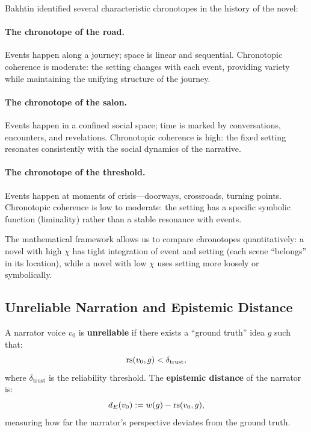 \begin{interpretation}
\label{interp:chronotope}
Bakhtin identified several characteristic chronotopes in the history of the
novel:

\paragraph{The chronotope of the road.} Events happen along a journey; space
is linear and sequential.  Chronotopic coherence is moderate: the setting
changes with each event, providing variety while maintaining the unifying
structure of the journey.

\paragraph{The chronotope of the salon.} Events happen in a confined social
space; time is marked by conversations, encounters, and revelations.
Chronotopic coherence is high: the fixed setting resonates consistently with
the social dynamics of the narrative.

\paragraph{The chronotope of the threshold.} Events happen at moments of
crisis---doorways, crossroads, turning points.  Chronotopic coherence is
low to moderate: the setting has a specific symbolic function (liminality)
rather than a stable resonance with events.

The mathematical framework allows us to compare chronotopes quantitatively:
a novel with high $\chi$ has tight integration of event and setting (each scene
``belongs'' in its location), while a novel with low $\chi$ uses setting more
loosely or symbolically.
\end{interpretation}







\subsection{Unreliable Narration and Epistemic Distance}

\begin{definition}
\label{def:unreliable}
A narrator voice $v_0$ is \textbf{unreliable} if there exists a
``ground truth'' idea $g$ such that:
\[
  \mathrm{rs}(v_0, g) < \delta_{\text{trust}},
\]
where $\delta_{\text{trust}}$ is the reliability threshold.  The
\textbf{epistemic distance} of the narrator is:
\[
  d_E(v_0) := w(g) - \mathrm{rs}(v_0, g),
\]
measuring how far the narrator's perspective deviates from the ground truth.
\end{definition}

